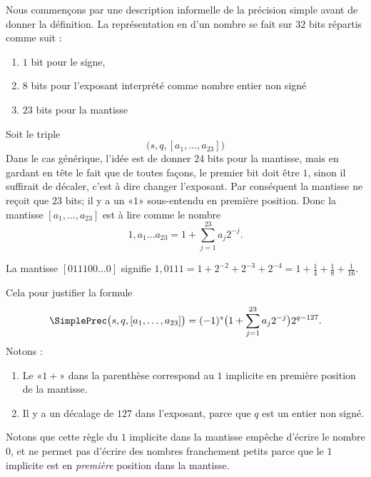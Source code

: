 Nous commençons par une description informelle de la précision simple avant de donner la définition. La représentation en  d'un nombre se fait sur \( 32\) bits répartis comme suit :
\begin{enumerate}
    \item
        \( 1\) bit pour le signe,
    \item
        \( 8\) bits pour l'exposant interprété comme nombre entier non signé
    \item
        \( 23\) bits pour la mantisse
\end{enumerate}
Soit le triple 
\begin{equation}
    \big( s,q,[a_1,\ldots, a_{23}] \big)
\end{equation}
Dans le cas générique, l'idée est de donner \( 24\) bits pour la mantisse, mais en gardant en tête le fait que de toutes façons, le premier bit doit être \( 1\), sinon il suffirait de décaler, c'est à dire changer l'exposant. Par conséquent la mantisse ne reçoit que \( 23\) bits; il y a un «\( 1\)» sous-entendu en première position. Donc la mantisse \( [a_1,\ldots, a_{23}]\) est à lire comme le nombre
\begin{equation}
    1,a_1\ldots a_{23}=1+\sum_{j=1}^{23}a_j2^{-j}.
\end{equation}
\begin{example}
    La mantisse \( [011100\ldots 0]\) signifie \(1,0111=1+2^{-2}+2^{-3}+2^{-4}=1+\frac{1}{ 4 }+\frac{1}{ 8 }+\frac{1}{ 16 } \).
\end{example}
Cela pour justifier la formule
\begin{equation}
    \SimplePrec\big( s,q,[a_1,\ldots, a_{23}] \big)=(-1)^s\big( 1+\sum_{j=1}^{23}a_j2^{-j} \big)2^{q-127}.
\end{equation}
Notons :
\begin{enumerate}
    \item
        Le «\( 1+\)» dans la parenthèse correspond au \( 1\) implicite en première position de la mantisse.
    \item
        Il y a un décalage de \( 127\) dans l'exposant, parce que \( q\) est un entier non signé.
\end{enumerate}

Notons que cette règle du \( 1\) implicite dans la mantisse empêche d'écrire le nombre \( 0\), et ne permet pas d'écrire des nombres franchement petits parce que le \( 1\) implicite est en \emph{première} position dans la mantisse.

